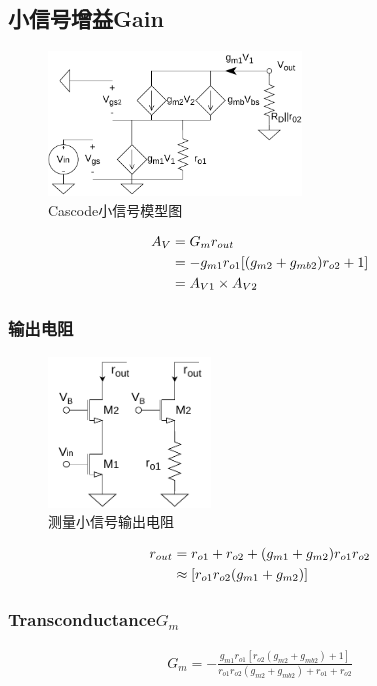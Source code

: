\documentclass[twoside,a4paper,openright,titlepage,draft]{ctexrep}
\begin{document}
\subsection{小信号增益Gain}
\begin{figure}[H]
    \centering
    \includegraphics[width=0.6\textwidth]{smallsignal.drawio.pdf}
    \caption{Cascode小信号模型图}
    \label{fig:小信号模型图}
\end{figure}
\begin{align}
    A_V &= G_mr_{out} \notag \\
    &= -g_{m1}r_{o1}[(g_{m2} + g_{mb2})r_{o2} + 1]\notag \\
    &= A_{V1}\times A_{V2}
\end{align}
\subsubsection{输出电阻}
\begin{multicols}{2}
    \begin{figure}[H]
        \centering
        \includegraphics[height=40mm]{outputimpedence.drawio.pdf}
        \caption{测量小信号输出电阻}
        \label{fig:测量小信号输出电阻}
    \end{figure}
    \columnbreak
    \begin{align}
        r_{out} &= r_{o1} + r_{o2} + (g_{m1} + g_{m2})r_{o1}r_{o2} \notag \\
        &\approx [r_{o1}r_{o2}(g_{m1} + g_{m2})]
    \end{align}    
\end{multicols}
\subsubsection{Transconductance$G_m$}
\begin{align}
    G_m = -\frac{g_{m1}r_{o1}[r_{o2}(g_{m2}+g_{mb2})+1]}{r_{o1}r_{o2}(g_{m2}+g_{mb2})+r_{o1}+r_{o2}}
\end{align}
\end{document}
